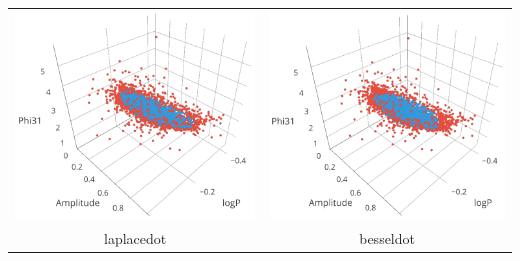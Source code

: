 \begin{longtable}{ c c }
	\includegraphics[width=0.3\paperwidth]{images/ksvm_laplacedot.png} & \includegraphics[width=0.3\paperwidth]{images/ksvm_besseldot.png} \\
	laplacedot & besseldot \\

\end{longtable}
